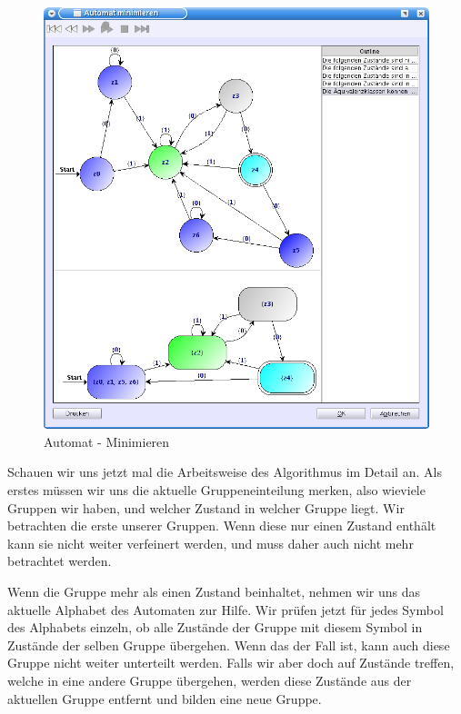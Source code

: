 \begin{figure}[h]
\begin{center}
\includegraphics[width=12cm]{../images/minimize.png}
\caption{Automat - Minimieren}
\end{center}
\end{figure}
\vspace{10pt}

Schauen wir uns jetzt mal die Arbeitsweise des Algorithmus im Detail an. Als
erstes müssen wir uns die aktuelle Gruppeneinteilung merken, also wieviele
Gruppen wir haben, und welcher Zustand in welcher Gruppe liegt. Wir betrachten
die erste unserer Gruppen. Wenn diese nur einen Zustand enthält kann sie nicht
weiter verfeinert werden, und muss daher auch nicht mehr betrachtet werden.
\vspace{10pt}

Wenn die Gruppe mehr als einen Zustand beinhaltet, nehmen wir uns das aktuelle
Alphabet des Automaten zur Hilfe. Wir prüfen jetzt für jedes Symbol des Alphabets
einzeln, ob alle Zustände der Gruppe mit diesem Symbol in Zustände der selben
Gruppe übergehen. Wenn das der Fall ist, kann auch diese Gruppe nicht weiter
unterteilt werden. Falls wir aber doch auf Zustände treffen, welche in eine
andere Gruppe übergehen, werden diese Zustände aus der aktuellen Gruppe entfernt
und bilden eine neue Gruppe. \vspace{10pt}


